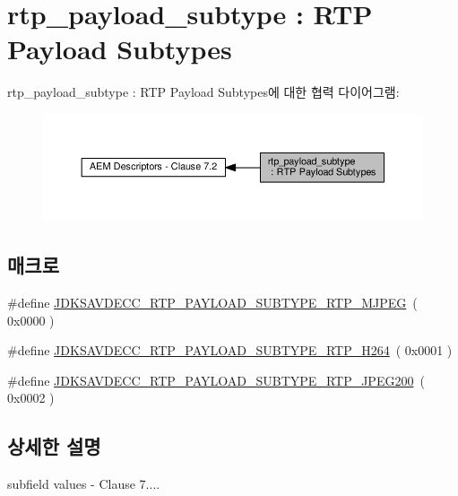 \hypertarget{group__rtp__payload__subtype}{}\section{rtp\+\_\+payload\+\_\+subtype \+: R\+TP Payload Subtypes}
\label{group__rtp__payload__subtype}
rtp\+\_\+payload\+\_\+subtype \+: R\+TP Payload Subtypes에 대한 협력 다이어그램\+:
\nopagebreak
\begin{figure}[H]
\begin{center}
\leavevmode
\includegraphics[width=350pt]{group__rtp__payload__subtype}
\end{center}
\end{figure}
\subsection*{매크로}
\begin{DoxyCompactItemize}
\item 
\#define \hyperlink{group__rtp__payload__subtype_ga27119de23e9df56b0a6d42d0873bcf5b}{J\+D\+K\+S\+A\+V\+D\+E\+C\+C\+\_\+\+R\+T\+P\+\_\+\+P\+A\+Y\+L\+O\+A\+D\+\_\+\+S\+U\+B\+T\+Y\+P\+E\+\_\+\+R\+T\+P\+\_\+\+M\+J\+P\+EG}~( 0x0000 )
\item 
\#define \hyperlink{group__rtp__payload__subtype_gaa2652620452b60501b5ee4f0afa48ef4}{J\+D\+K\+S\+A\+V\+D\+E\+C\+C\+\_\+\+R\+T\+P\+\_\+\+P\+A\+Y\+L\+O\+A\+D\+\_\+\+S\+U\+B\+T\+Y\+P\+E\+\_\+\+R\+T\+P\+\_\+\+H264}~( 0x0001 )
\item 
\#define \hyperlink{group__rtp__payload__subtype_ga173b7a5f5197acd1b7c9b4da5175eefe}{J\+D\+K\+S\+A\+V\+D\+E\+C\+C\+\_\+\+R\+T\+P\+\_\+\+P\+A\+Y\+L\+O\+A\+D\+\_\+\+S\+U\+B\+T\+Y\+P\+E\+\_\+\+R\+T\+P\+\_\+\+J\+P\+E\+G200}~( 0x0002 )
\end{DoxyCompactItemize}


\subsection{상세한 설명}
subfield values -\/ Clause 7.... 

